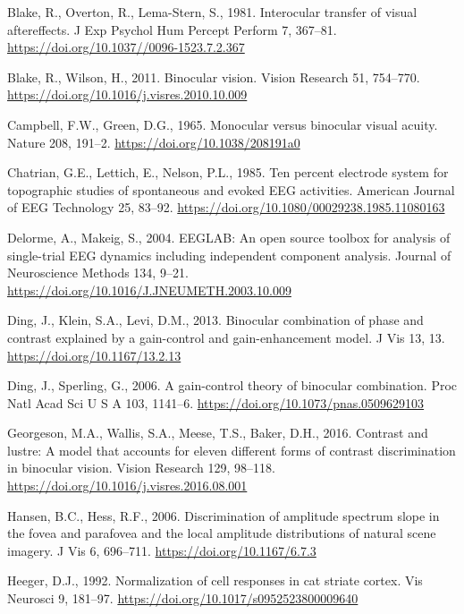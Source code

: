\documentclass[
  12pt,
]{article}
\newlength{\cslhangindent}
\newenvironment{CSLReferences}[2] %
 {\begin{list}{}{%
  \setlength{\itemindent}{0pt}
  \setlength{\leftmargin}{0pt}
  \setlength{\parsep}{0pt}
  \ifodd #1
   \setlength{\leftmargin}{\cslhangindent}
   \setlength{\itemindent}{-1\cslhangindent}
  \fi
  \setlength{\itemsep}{#2\baselineskip}}}
 {\end{list}}
\begin{document}
\begin{CSLReferences}{1}{0}
Blake, R., Overton, R., Lema-Stern, S., 1981. Interocular transfer of
visual aftereffects. J Exp Psychol Hum Percept Perform 7, 367--81.
\url{https://doi.org/10.1037//0096-1523.7.2.367}

Blake, R., Wilson, H., 2011. Binocular vision. Vision Research 51,
754--770. \url{https://doi.org/10.1016/j.visres.2010.10.009}

Campbell, F.W., Green, D.G., 1965. Monocular versus binocular visual
acuity. Nature 208, 191--2. \url{https://doi.org/10.1038/208191a0}

Chatrian, G.E., Lettich, E., Nelson, P.L., 1985. Ten percent electrode
system for topographic studies of spontaneous and evoked EEG activities.
American Journal of EEG Technology 25, 83--92.
\url{https://doi.org/10.1080/00029238.1985.11080163}

Delorme, A., Makeig, S., 2004. EEGLAB: An open source toolbox for
analysis of single-trial EEG dynamics including independent component
analysis. Journal of Neuroscience Methods 134, 9--21.
\url{https://doi.org/10.1016/J.JNEUMETH.2003.10.009}

Ding, J., Klein, S.A., Levi, D.M., 2013. Binocular combination of phase
and contrast explained by a gain-control and gain-enhancement model. J
Vis 13, 13. \url{https://doi.org/10.1167/13.2.13}

Ding, J., Sperling, G., 2006. A gain-control theory of binocular
combination. Proc Natl Acad Sci U S A 103, 1141--6.
\url{https://doi.org/10.1073/pnas.0509629103}

Georgeson, M.A., Wallis, S.A., Meese, T.S., Baker, D.H., 2016. Contrast
and lustre: A model that accounts for eleven different forms of contrast
discrimination in binocular vision. Vision Research 129, 98--118.
\url{https://doi.org/10.1016/j.visres.2016.08.001}

Hansen, B.C., Hess, R.F., 2006. Discrimination of amplitude spectrum
slope in the fovea and parafovea and the local amplitude distributions
of natural scene imagery. J Vis 6, 696--711.
\url{https://doi.org/10.1167/6.7.3}

Heeger, D.J., 1992. Normalization of cell responses in cat striate
cortex. Vis Neurosci 9, 181--97.
\url{https://doi.org/10.1017/s0952523800009640}


\end{CSLReferences}
\end{document}
